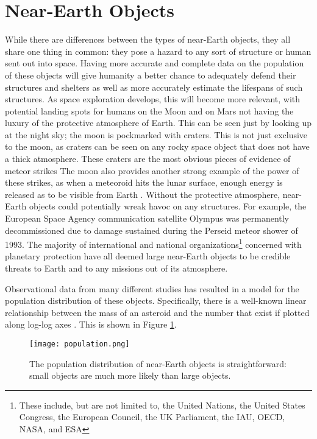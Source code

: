\section{Near-Earth Objects}
While there are differences between the types of near-Earth objects, they all share one thing in common: they pose a hazard to any sort of structure or human sent out into space. Having more accurate and complete data on the population of these objects will give humanity a better chance to adequately defend their structures and shelters as well as more accurately estimate the lifespans of such structures. As space exploration develops, this will become more relevant, with potential landing spots for humans on the Moon and on Mars not having the luxury of the protective atmosphere of Earth. This can be seen just by looking up at the night sky; the moon is pockmarked with craters. This is not just exclusive to the moon, as craters can be seen on any rocky space object that does not have a thick atmosphere. These craters are the most obvious pieces of evidence of meteor strikes The moon also provides another strong example of the power of these strikes, as when a meteoroid hits the lunar surface, enough energy is released as to be visible from Earth \cite{Rembold2015}. Without the protective atmosphere, near-Earth objects could potentially wreak havoc on any structures. For example, the European Space Agency communication satellite Olympus was permanently decommissioned due to damage sustained during the Perseid meteor shower of 1993. The majority of international and national organizations\footnote{These include, but are not limited to, the United Nations, the United States Congress, the European Council, the UK Parliament, the IAU, OECD, NASA, and ESA\cite{Bottke2007}} concerned with planetary protection have all deemed large near-Earth objects to be credible threats to Earth and to any missions out of its atmosphere\cite{Bottke2007}.

Observational data from many different studies has resulted in a model for the population distribution of these objects. Specifically, there is a well-known linear relationship between the mass of an asteroid and the number that exist if plotted along log-log axes \cite{Rembold2015}. This is shown in Figure \ref{fig:population}.

\begin{figure}[ht!]
  \centering
  \texttt{[image: population.png]}
  \caption{The population distribution of near-Earth objects is straightforward: small objects are much more likely than large objects. \protect\cite{Rembold2015}}
  \label{fig:population}
\end{figure}

